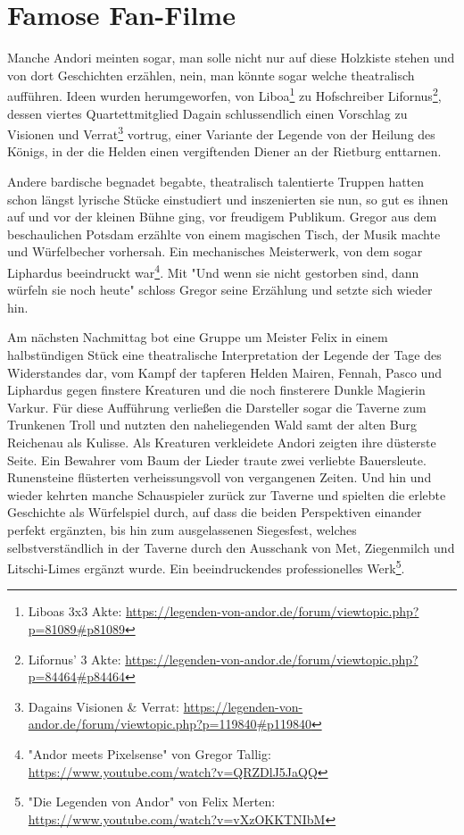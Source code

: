 \newpage
\section{Famose Fan-Filme}


Manche Andori meinten sogar, man solle nicht nur auf diese Holzkiste stehen und von dort Geschichten erzählen, nein, man könnte sogar welche theatralisch aufführen. Ideen wurden herumgeworfen, von Liboa\footnote{Liboas 3x3 Akte: \url{https://legenden-von-andor.de/forum/viewtopic.php?p=81089\#p81089}} zu Hofschreiber Lifornus\footnote{Lifornus' 3 Akte: \url{https://legenden-von-andor.de/forum/viewtopic.php?p=84464\#p84464}}, dessen viertes Quartettmitglied Dagain schlussendlich einen Vorschlag zu Visionen und Verrat\footnote{Dagains Visionen \& Verrat: \url{https://legenden-von-andor.de/forum/viewtopic.php?p=119840\#p119840}} vortrug, einer Variante der Legende von der Heilung des Königs, in der die Helden einen vergiftenden Diener an der Rietburg enttarnen.

Andere bardische begnadet begabte, theatralisch talentierte Truppen hatten schon längst lyrische Stücke einstudiert und inszenierten sie nun, so gut es ihnen auf und vor der kleinen Bühne ging, vor freudigem Publikum. Gregor aus dem beschaulichen Potsdam erzählte von einem magischen Tisch, der Musik machte und Würfelbecher vorhersah. Ein mechanisches Meisterwerk, von dem sogar Liphardus beeindruckt war\footnote{"Andor meets Pixelsense" von Gregor Tallig: \url{https://www.youtube.com/watch?v=QRZDlJ5JaQQ}}.  Mit "Und wenn sie nicht gestorben sind, dann würfeln sie noch heute" schloss Gregor seine Erzählung und setzte sich wieder hin.

Am nächsten Nachmittag bot eine Gruppe um Meister Felix in einem halbstündigen Stück eine theatralische Interpretation der Legende der Tage des Widerstandes dar, vom Kampf der tapferen Helden Mairen, Fennah, Pasco und Liphardus gegen finstere Kreaturen und die noch finsterere Dunkle Magierin Varkur. Für diese Aufführung verließen die Darsteller sogar die Taverne zum Trunkenen Troll und nutzten den naheliegenden Wald samt der alten Burg Reichenau als Kulisse. Als Kreaturen verkleidete Andori zeigten ihre düsterste Seite. Ein Bewahrer vom Baum der Lieder traute zwei verliebte Bauersleute. Runensteine flüsterten verheissungsvoll von vergangenen Zeiten. Und hin und wieder kehrten manche Schauspieler zurück zur Taverne und spielten die erlebte Geschichte als Würfelspiel durch, auf dass die beiden Perspektiven einander perfekt ergänzten, bis hin zum ausgelassenen Siegesfest, welches selbstverständlich in der Taverne durch den Ausschank von Met, Ziegenmilch und Litschi-Limes ergänzt wurde. Ein beeindruckendes professionelles Werk\footnote{"Die Legenden von Andor" von Felix Merten: \url{https://www.youtube.com/watch?v=vXzOKKTNIbM}}.

